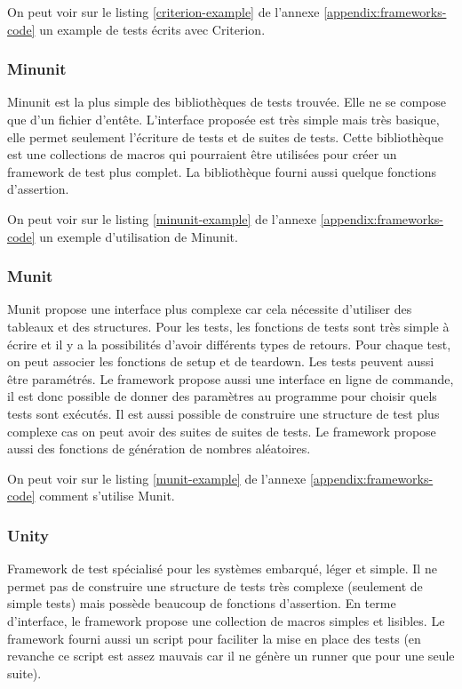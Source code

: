 \documentclass[a4paper]{article}
\begin{document}
On peut voir sur le listing \ref{criterion-example} de l'annexe
\ref{appendix:frameworks-code} un example de tests écrits avec Criterion.

\subsubsection*{Minunit}

Minunit est la plus simple des bibliothèques de tests trouvée. Elle ne se
compose que d'un fichier d'entête. L'interface proposée est très simple mais
très basique, elle permet seulement l'écriture de tests et de suites de tests.
Cette bibliothèque est une collections de macros qui pourraient être utilisées
pour créer un framework de test plus complet. La bibliothèque fourni aussi
quelque fonctions d'assertion.

On peut voir sur le listing \ref{minunit-example} de l'annexe
\ref{appendix:frameworks-code} un exemple d'utilisation de Minunit.

\subsubsection*{Munit}

Munit propose une interface plus complexe car cela nécessite d'utiliser des
tableaux et des structures. Pour les tests, les fonctions de tests sont très
simple à écrire et il y a la possibilités d'avoir différents types de retours.
Pour chaque test, on peut associer les fonctions de setup et de teardown. Les
tests peuvent aussi être paramétrés. Le framework propose aussi une interface en
ligne de commande, il est donc possible de donner des paramètres au programme
pour choisir quels tests sont exécutés. Il est aussi possible de construire une
structure de test plus complexe cas on peut avoir des suites de suites de tests.
Le framework propose aussi des fonctions de génération de nombres aléatoires.

On peut voir sur le listing \ref{munit-example} de l'annexe
\ref{appendix:frameworks-code} comment s'utilise Munit.

\subsubsection*{Unity}

Framework de test spécialisé pour les systèmes embarqué, léger et simple. Il ne
permet pas de construire une structure de tests très complexe (seulement de
simple tests) mais possède beaucoup de fonctions d'assertion. En terme
d'interface, le framework propose une collection de macros simples et lisibles.
Le framework fourni aussi un script pour faciliter la mise en place des tests
(en revanche ce script est assez mauvais car il ne génère un runner que pour une
seule suite).
\end{document}
